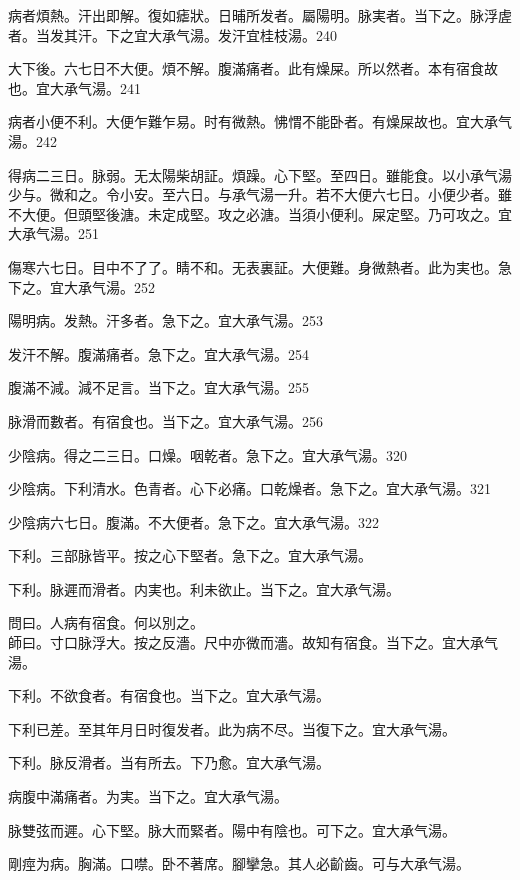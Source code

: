 病者煩熱。汗出即解。復如瘧狀。日晡所发者。屬陽明。脉実者。当下之。脉浮虗者。当发其汗。下之宜{\khaaitp 大}承气湯。发汗宜桂枝湯。240

大下後。六七日不大便。煩不解。腹滿痛者。此有燥屎。所以然者。本有宿食故也。宜{\khaaitp 大}承气湯。241

病者小便不利。大便乍難乍易。时有微熱。怫㥜不能卧者。有燥屎故也。宜{\khaaitp 大}承气湯。242

得病二三日。脉弱。无太陽柴胡証。煩躁。心下堅。至四日。雖能食。以{\khaaitp 小}承气湯少与。微和之。令小安。至六日。与承气湯一升。若不大便六七日。小便少者。雖不大便。但頭堅後溏。未定成堅。攻之必溏。当須小便利。屎定堅。乃可攻之。宜{\khaaitp 大}承气湯。251

傷寒六七日。目中不了了。睛不和。无表{\khaaitp 裏}証。大便難。身微熱者。此为実也。急下之。宜{\khaaitp 大}承气湯。252

陽明病。发熱。汗多者。急下之。宜{\khaaitp 大}承气湯。253

发汗不解。腹滿痛者。急下之。宜{\khaaitp 大}承气湯。254

腹滿不減。減不足言。当下之。宜{\khaaitp 大}承气湯。255

脉滑而數者。有宿食也。当下之。宜{\khaaitp 大}承气湯。256

少陰病。得之二三日。口燥。咽乾者。急下之。宜{\khaaitp 大}承气湯。320

少陰病。{\khaaitp 下}利清水。色青者。心下必痛。口乾燥者。急下之。宜{\khaaitp 大}承气湯。321

少陰病六七日。腹滿。不大便者。急下之。宜{\khaaitp 大}承气湯。322

下利。三部脉皆平。按之心下堅者。急下之。宜{\khaaitp 大}承气湯。

下利。脉遲而滑者。{\khaaitp 内}実也。利未欲止。当下之。宜{\khaaitp 大}承气湯。

問曰。人病有宿食。何以別之。\\
師曰。寸口脉浮大。按之反濇。尺中亦微而濇。故知有宿食。当下之。宜{\khaaitp 大}承气湯。

下利。不欲食者。有宿食也。当下之。宜{\khaaitp 大}承气湯。

下利{\khaaitp 已}差。至其{\khaaitp 年月日}时復发者。此为病不尽。当復下之。宜{\khaaitp 大}承气湯。

下利。脉反滑{\khaaitp 者}。当有所去。下乃愈。宜大承气湯。

病腹中滿痛者。为実。当下之。宜大承气湯。

脉雙弦而遲。心下堅。脉大而緊者。陽中有陰也。可下之。宜{\khaaitp 大}承气湯。

{\khaaitp 剛}痙为病。胸滿。口噤。卧不著席。腳攣急。其人必齘齒。可与大承气湯。


